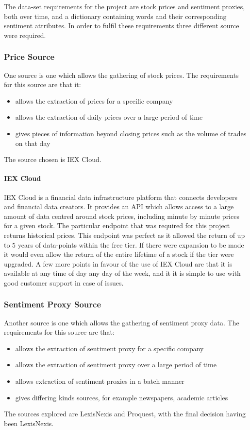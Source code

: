 The data-set requirements for the project are stock prices and sentiment proxies, both over time, and a dictionary containing words and their corresponding sentiment attributes. In order to fulfil these requirements three different source were required.

\subsubsection{Price Source}

One source is one which allows the gathering of stock prices. The requirements for this source are that it:
\begin{itemize}
    \item allows the extraction of prices for a specific company
    \item allows the extraction of daily prices over a large period of time
    \item gives pieces of information beyond closing prices such as the volume of trades on that day
\end{itemize}
The source chosen is IEX Cloud.

\paragraph{IEX Cloud}

IEX Cloud is a financial data infrastructure platform that connects developers and financial data creators. It provides an API which allows access to a large amount of data centred around stock prices, including minute by minute prices for a given stock. The particular endpoint that was required for this project returns historical prices. This endpoint was perfect as it allowed the return of up to 5 years of data-points within the free tier. If there were expansion to be made it would even allow the return of the entire lifetime of a stock if the tier were upgraded. A few more points in favour of the use of IEX Cloud are that it is available at any time of day any day of the week, and it it is simple to use with good customer support in case of issues.

\subsubsection{Sentiment Proxy Source}

Another source is one which allows the gathering of sentiment proxy data. The requirements for this source are that:
\begin{itemize}
    \item allows the extraction of sentiment proxy for a specific company
    \item allows the extraction of sentiment proxy over a large period of time
    \item allows extraction of sentiment proxies in a batch manner
    \item gives differing kinds sources, for example newspapers, academic articles
\end{itemize}
The sources explored are LexisNexis and Proquest, with the final decision having been LexisNexis.

